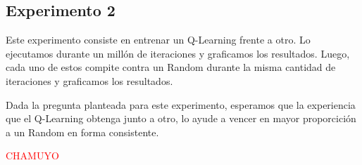 \subsection{Experimento 2}

Este experimento consiste en entrenar un Q-Learning frente a otro. Lo ejecutamos durante un mill\'on de iteraciones y graficamos los resultados. Luego, cada uno de estos compite contra un Random durante la misma cantidad de iteraciones y graficamos los resultados.

Dada la pregunta planteada para este experimento, esperamos que la experiencia que el Q-Learning obtenga junto a otro, lo ayude a vencer en mayor proporcici\'on a un Random en forma consistente.

\textcolor{red}{CHAMUYO}
